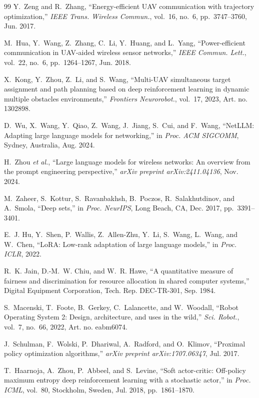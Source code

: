 \documentclass[journal]{IEEEtran}
\begin{document}
\begin{thebibliography}{99}
Y.~Zeng and R.~Zhang, ``Energy-efficient UAV communication with trajectory optimization,'' \textit{IEEE Trans. Wireless Commun.}, vol.~16, no.~6, pp.~3747--3760, Jun. 2017.

M.~Hua, Y.~Wang, Z.~Zhang, C.~Li, Y.~Huang, and L.~Yang, ``Power-efficient communication in UAV-aided wireless sensor networks,'' \textit{IEEE Commun. Lett.}, vol.~22, no.~6, pp.~1264--1267, Jun. 2018.

X.~Kong, Y.~Zhou, Z.~Li, and S.~Wang, ``Multi-UAV simultaneous target assignment and path planning based on deep reinforcement learning in dynamic multiple obstacles environments,'' \textit{Frontiers Neurorobot.}, vol.~17, 2023, Art. no. 1302898.

D.~Wu, X.~Wang, Y.~Qiao, Z.~Wang, J.~Jiang, S.~Cui, and F.~Wang, ``NetLLM: Adapting large language models for networking,'' in \textit{Proc. ACM SIGCOMM}, Sydney, Australia, Aug. 2024.

H.~Zhou \textit{et al.}, ``Large language models for wireless networks: An overview from the prompt engineering perspective,'' \textit{arXiv preprint arXiv:2411.04136}, Nov. 2024.

M.~Zaheer, S.~Kottur, S.~Ravanbakhsh, B.~Poczos, R.~Salakhutdinov, and A.~Smola, ``Deep sets,'' in \textit{Proc. NeurIPS}, Long Beach, CA, Dec. 2017, pp.~3391--3401.

E.~J. Hu, Y.~Shen, P.~Wallis, Z.~Allen-Zhu, Y.~Li, S.~Wang, L.~Wang, and W.~Chen, ``LoRA: Low-rank adaptation of large language models,'' in \textit{Proc. ICLR}, 2022.

R.~K. Jain, D.-M.~W. Chiu, and W.~R. Hawe, ``A quantitative measure of fairness and discrimination for resource allocation in shared computer systems,'' Digital Equipment Corporation, Tech. Rep. DEC-TR-301, Sep. 1984.

S.~Macenski, T.~Foote, B.~Gerkey, C.~Lalancette, and W.~Woodall, ``Robot Operating System 2: Design, architecture, and uses in the wild,'' \textit{Sci. Robot.}, vol.~7, no.~66, 2022, Art. no. eabm6074.

J.~Schulman, F.~Wolski, P.~Dhariwal, A.~Radford, and O.~Klimov, ``Proximal policy optimization algorithms,'' \textit{arXiv preprint arXiv:1707.06347}, Jul. 2017.

T.~Haarnoja, A.~Zhou, P.~Abbeel, and S.~Levine, ``Soft actor-critic: Off-policy maximum entropy deep reinforcement learning with a stochastic actor,'' in \textit{Proc. ICML}, vol.~80, Stockholm, Sweden, Jul. 2018, pp.~1861--1870.


\end{thebibliography}
\end{document}
